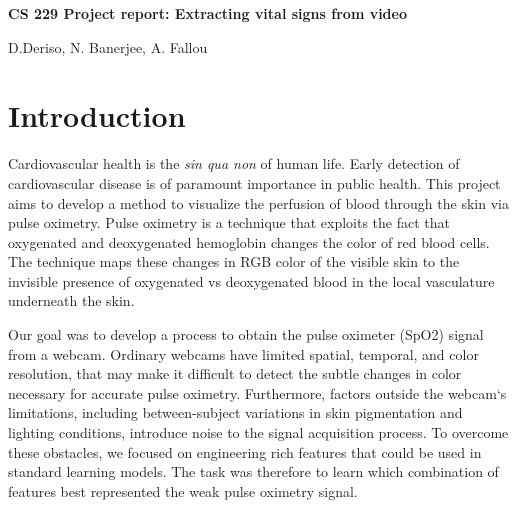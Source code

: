 \documentclass[12pt]{article}
\begin{document}
 \centerline{\Large \bf CS 229 Project report: Extracting vital signs from video} %

 \medskip

 \centerline{D.Deriso, N. Banerjee, A. Fallou}
 \bigskip
\thispagestyle{plain}
\begin{abstract}
In both developing and developed countries, reducing the cost of medical care is a primary goal of science and government. In this project we seek to find and extract information from a video of a human that tells us the pulse rate and the oxygen level of the blood, with the eventual aim to create a virtual pulse oximeter. Features to be extracted were chosen to be related to the three color channel intensity values, with the idea that changing color of the video would relate to blood flow around the body. Extensive pre-processing was required on both the video data and the pulse oximeter data to enable training. Early results showed that feature selection was vital in reducing the mean-squared error of the output. At the end of this report, we outline further work to be done.

\end{abstract}


\section{Introduction}
%
\small  

Cardiovascular health is the \emph{sin qua non} of human life. Early detection of cardiovascular disease is of paramount importance in public health. This project aims to develop a method to visualize the perfusion of blood through the skin via pulse oximetry. Pulse oximetry is a technique that exploits the fact that oxygenated and deoxygenated hemoglobin changes the color of red blood cells. The technique maps these changes in RGB color of the visible skin to the invisible presence of oxygenated vs deoxygenated blood in the local vasculature underneath the skin.

Our goal was to develop a process to obtain the pulse oximeter (SpO2) signal from a webcam. Ordinary webcams have limited spatial, temporal, and color resolution, that may make it difficult to detect the subtle changes in color necessary for accurate pulse oximetry. Furthermore, factors outside the webcam`s limitations, including between-subject variations in skin pigmentation and lighting conditions, introduce noise to the signal acquisition process. To overcome these obstacles, we focused on engineering rich features that could be used in standard learning models. The task was therefore to learn which combination of features best represented the weak pulse oximetry signal.
\end{document}
